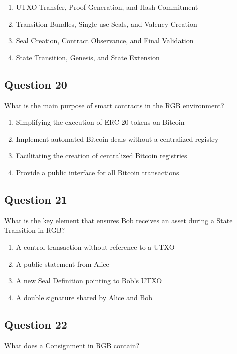 \documentclass[12pt,a4paper]{article}
\begin{document}
\begin{enumerate}[label=\Alph*., leftmargin=*]
\item UTXO Transfer, Proof Generation, and Hash Commitment
\item Transition Bundles, Single-use Seals, and Valency Creation
\item Seal Creation, Contract Observance, and Final Validation
\item State Transition, Genesis, and State Extension
\end{enumerate}

\bigskip


\subsection*{Question 20}
What is the main purpose of smart contracts in the RGB environment?

\begin{enumerate}[label=\Alph*., leftmargin=*]
\item Simplifying the execution of ERC-20 tokens on Bitcoin
\item Implement automated Bitcoin deals without a centralized registry
\item Facilitating the creation of centralized Bitcoin registries
\item Provide a public interface for all Bitcoin transactions
\end{enumerate}

\bigskip


\subsection*{Question 21}
What is the key element that ensures Bob receives an asset during a State Transition in RGB?

\begin{enumerate}[label=\Alph*., leftmargin=*]
\item A control transaction without reference to a UTXO
\item A public statement from Alice
\item A new Seal Definition pointing to Bob's UTXO
\item A double signature shared by Alice and Bob
\end{enumerate}

\bigskip


\subsection*{Question 22}
What does a Consignment in RGB contain?
\end{document}
